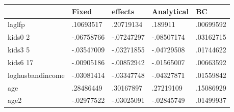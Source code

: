\begin{table}[htbp]
\begin{tabular}{|l|l|l|l|l|}\hline  
 & Fixed  & effects  & Analytical  & BC  \\ \hline  
laglfp & .10693517 & .20719134 & .189911 & .00699592 \\ \hline 
kids0 2 & -.06758766 & -.07247297 & -.08507174 & .03162715 \\ \hline 
kids3 5 & -.03547009 & -.03271855 & -.04729508 & .01744622 \\ \hline 
kids6 17 & -.00905186 & -.00852942 & -.01565007 & .00663592 \\ \hline 
loghusbandincome & -.03081414 & -.03347748 & -.04327871 & .01559842 \\ \hline 
age & .28486449 & .30167897 & .27219109 & .15086929 \\ \hline 
age2 & -.02977522 & -.03025091 & -.02845749 & .01499937 \\ \hline 
  \end{tabular}
\end{table}
